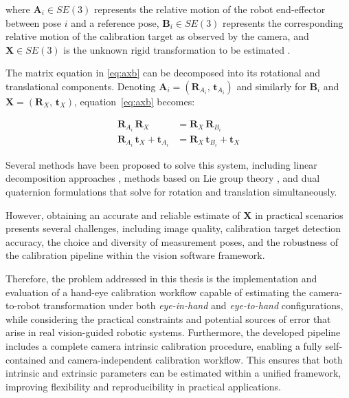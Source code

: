 \noindent where $\mathbf{A}_i \in SE(3)$ represents the relative motion of the
robot end-effector between pose $i$ and a reference pose, $\mathbf{B}_i \in SE(3)$
represents the corresponding relative motion of the calibration target as observed
by the camera, and $\mathbf{X} \in SE(3)$ is the unknown rigid transformation to
be estimated \cite{shiu1989calibration, tsai1989new}.

The matrix equation in \eqref{eq:axb} can be decomposed into its rotational and
translational components. Denoting $\mathbf{A}_i = (\mathbf{R}_{A_i},\,
\mathbf{t}_{A_i})$ and similarly for $\mathbf{B}_i$ and $\mathbf{X} =
(\mathbf{R}_X,\, \mathbf{t}_X)$, equation~\eqref{eq:axb} becomes:

\begin{align}
    \mathbf{R}_{A_i}\,\mathbf{R}_X &= \mathbf{R}_X\,\mathbf{R}_{B_i}
    \label{eq:rot_component}\\
    \mathbf{R}_{A_i}\,\mathbf{t}_X + \mathbf{t}_{A_i} &=
    \mathbf{R}_X\,\mathbf{t}_{B_i} + \mathbf{t}_X
    \label{eq:trans_component}
\end{align}

Several methods have been proposed to solve this system, including linear
decomposition approaches \cite{shiu1989calibration, tsai1989new}, methods based
on Lie group theory \cite{park1994robot}, and dual quaternion formulations
\cite{daniilidis1999hand} that solve for rotation and translation simultaneously.

However, obtaining an accurate and reliable estimate of $\mathbf{X}$ in practical
scenarios presents several challenges, including image quality, calibration target
detection accuracy, the choice and diversity of measurement poses, and the
robustness of the calibration pipeline within the vision software framework.

Therefore, the problem addressed in this thesis is the implementation and
evaluation of a hand-eye calibration workflow capable of estimating the
camera-to-robot transformation under both \textit{eye-in-hand} and
\textit{eye-to-hand} configurations, while considering the practical constraints
and potential sources of error that arise in real vision-guided robotic systems.
Furthermore, the developed pipeline includes a complete camera intrinsic calibration procedure, enabling a fully self-contained and camera-independent calibration workflow. This ensures that both intrinsic and extrinsic parameters can be estimated within a unified framework, improving flexibility and reproducibility in practical applications.




